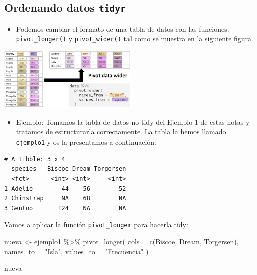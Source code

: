 \documentclass[
  letterpaper,
  DIV=11,
  numbers=noendperiod]{scrreprt}
\newenvironment{Shaded}{\begin{snugshade}}{\end{snugshade}}
\newcommand{\AttributeTok}[1]{\textcolor[rgb]{0.40,0.45,0.13}{#1}}
\newcommand{\FunctionTok}[1]{\textcolor[rgb]{0.28,0.35,0.67}{#1}}
\newcommand{\NormalTok}[1]{\textcolor[rgb]{0.00,0.23,0.31}{#1}}
\newcommand{\OtherTok}[1]{\textcolor[rgb]{0.00,0.23,0.31}{#1}}
\newcommand{\SpecialCharTok}[1]{\textcolor[rgb]{0.37,0.37,0.37}{#1}}
\newcommand{\StringTok}[1]{\textcolor[rgb]{0.13,0.47,0.30}{#1}}
\providecommand{\tightlist}{%
  \setlength{\itemsep}{0pt}\setlength{\parskip}{0pt}}\usepackage{longtable,booktabs,array}
\begin{document}
\subsection{\texorpdfstring{Ordenando datos
\texttt{tidyr}}{Ordenando datos tidyr}}\label{ordenando-datos-tidyr}

\begin{itemize}
\tightlist
\item
  Podemos cambiar el formato de una tabla de datos con las funciones:
  \texttt{pivot\_longer()} y \texttt{pivot\_wider()} tal como se muestra
  en la siguiente figura.
\end{itemize}

\begin{center}
\includegraphics[width=0.5\textwidth,height=\textheight]{Figuras/pivotando.png}
\end{center}

\begin{itemize}
\tightlist
\item
  {Ejemplo}: Tomamos la tabla de datos no tidy del Ejemplo 1 de estas
  notas y tratamos de estructurarla correctamente. La tabla la hemos
  llamado \texttt{ejemplo1} y os la presentamos a continuación:
\end{itemize}

\begin{verbatim}
# A tibble: 3 x 4
  species   Biscoe Dream Torgersen
  <fct>      <int> <int>     <int>
1 Adelie        44    56        52
2 Chinstrap     NA    68        NA
3 Gentoo       124    NA        NA
\end{verbatim}

Vamos a aplicar la función \texttt{pivot\_longer} para hacerla tidy:

\begin{Shaded}
\begin{Highlighting}[]
\NormalTok{nueva }\OtherTok{\textless{}{-}}\NormalTok{ ejemplo1 }\SpecialCharTok{\%\textgreater{}\%} 
  \FunctionTok{pivot\_longer}\NormalTok{(}
    \AttributeTok{cols =} \FunctionTok{c}\NormalTok{(Biscoe, Dream, Torgersen),}
    \AttributeTok{names\_to =} \StringTok{"Isla"}\NormalTok{, }\AttributeTok{values\_to =} \StringTok{"Frecuencia"}
\NormalTok{  )}

\NormalTok{nueva}
\end{Highlighting}
\end{Shaded}
\end{document}

